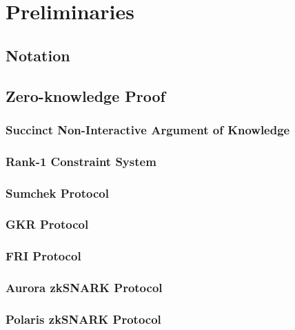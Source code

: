 \chapter{Preliminaries}

\section{Notation}

\newpage
\section{Zero-knowledge Proof}

\subsection{Succinct Non-Interactive Argument of Knowledge}

\subsection{Rank-1 Constraint System}

\subsection{Sumchek Protocol}

\subsection{GKR Protocol}

\subsection{FRI Protocol}

\subsection{Aurora zkSNARK Protocol}

\subsection{Polaris zkSNARK Protocol}

